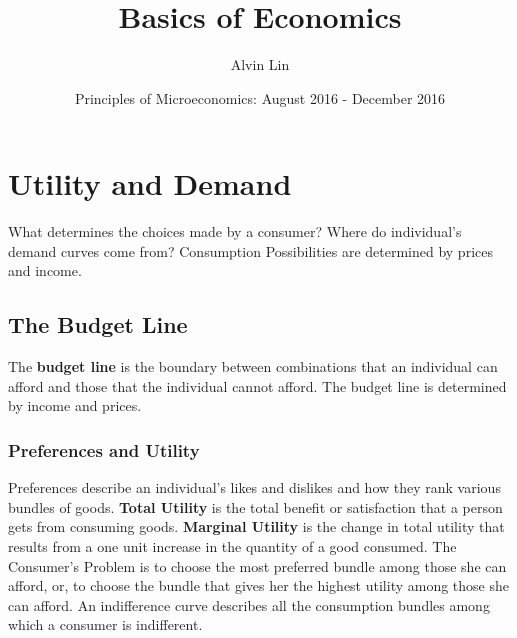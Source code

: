 \documentclass[letterpaper, 12pt]{article}
\title{Basics of Economics}
\author{Alvin Lin}
\date{Principles of Microeconomics: August 2016 - December 2016}
\begin{document}
\maketitle

\section{Utility and Demand}
What determines the choices made by a consumer? Where do individual's demand
curves come from? Consumption Possibilities are determined by prices and
income.

\subsection{The Budget Line}
The \textbf{budget line} is the boundary between combinations that an
individual can afford and those that the individual cannot afford. The budget
line is determined by income and prices.

\subsubsection{Preferences and Utility}
Preferences describe an individual's likes and dislikes and how they rank
various bundles of goods. \textbf{Total Utility} is the total benefit or
satisfaction that a person gets from consuming goods. \textbf{Marginal
Utility} is the change in total utility that results from a one unit
increase in the quantity of a good consumed. The Consumer's Problem is to
choose the most preferred bundle among those she can afford, or, to choose
the bundle that gives her the highest utility among those she can afford.
An indifference curve describes all the consumption bundles among which
a consumer is indifferent.
\end{document}
